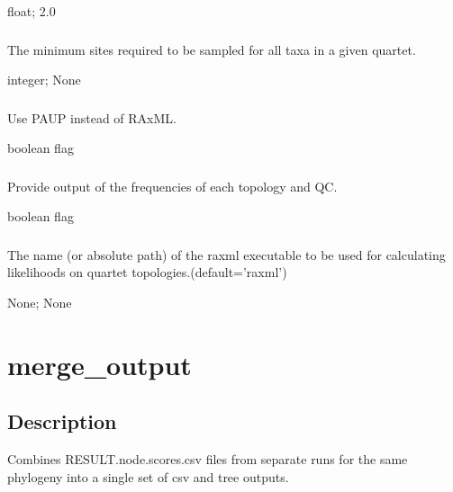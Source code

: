 \documentclass[letterpaper,12pt,english]{sphinxmanual}
\begin{document}
 float;  2.0


\subsubsection{}
\label{\detokenize{prog_desc:o-min-overlap}}
 The minimum sites required to be sampled for all taxa in a given quartet.

 integer;  None


\subsubsection{}
\label{\detokenize{prog_desc:p-paup}}
 Use PAUP instead of RAxML.

 boolean flag


\subsubsection{}
\label{\detokenize{prog_desc:v-verbout}}
 Provide output of the frequencies of each topology and QC.

 boolean flag


\subsubsection{}
\label{\detokenize{prog_desc:x-raxml-executable}}
 The name (or absolute path) of the raxml executable to be used for calculating likelihoods on quartet topologies.(default=’raxml’)

 None;  None


\section{merge\_output}
\label{\detokenize{prog_desc:merge-output}}

\subsection{Description}
\label{\detokenize{prog_desc:id1}}
Combines RESULT.node.scores.csv files from separate
runs for the same phylogeny into a single set of csv and tree outputs.
\end{document}

